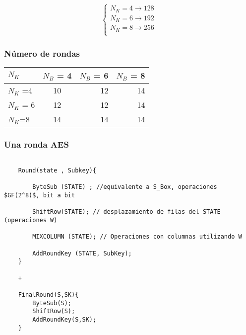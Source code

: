 		$$\begin{cases}
		N_K = 4 \rightarrow 128\\
		N_K = 6 \rightarrow 192\\
		N_K = 8 \rightarrow 256\\
		\end{cases}$$
		
\subsubsection{Número de rondas}
	\begin{center}
		
		\begin{tabular}{l | c | r | r }
		$N_K$ & $N_B$ = 4 & $N_B$ = 6 & $N_B$ = 8\\
		\hline
		$N_K$ =4 &  10 & 12 & 14\\
		\hline
		$N_K$ = 6 & 12 & 12 & 14\\
		\hline
		$N_K$=8 & 14 & 14 & 14
		
		\end{tabular}
	\end{center}

\subsubsection{Una ronda AES}
\lstset{language=C, breaklines=true, basicstyle=\footnotesize}
\begin{lstlisting}[frame=single]

	Round(state , Subkey){
	
		ByteSub (STATE) ; //equivalente a S_Box, operaciones $GF(2^8)$, bit a bit
	
		ShiftRow(STATE); // desplazamiento de filas del STATE (operaciones W)
	
		MIXCOLUMN (STATE); // Operaciones con columnas utilizando W
	
		AddRoundKey (STATE, SubKey);
	} 
	
	+
	 
	FinalRound(S,SK){
		ByteSub(S);
		ShiftRow(S);
		AddRoundKey(S,SK);
	}
		
\end{lstlisting}
